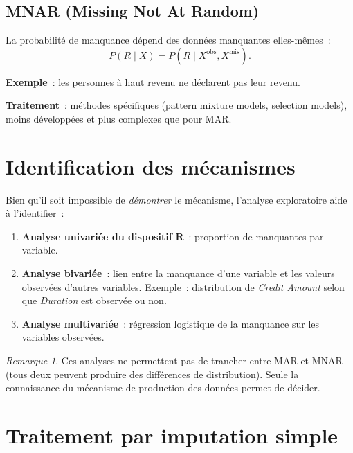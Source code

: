 \documentclass[a4paper,11pt]{article}
\theoremstyle{definition}
\theoremstyle{remark}
\newtheorem*{remark}{Remarque}
\begin{document}
\subsection{MNAR (Missing Not At Random)}

La probabilité de manquance dépend des données manquantes elles-mêmes~:
\[
P(R \mid X) = P(R \mid X^{\text{obs}}, X^{\text{mis}}).
\]

\textbf{Exemple}~: les personnes à haut revenu ne déclarent pas leur
revenu.

\textbf{Traitement}~: méthodes spécifiques (pattern mixture models,
selection models), moins développées et plus complexes que pour MAR.

\section{Identification des mécanismes}

Bien qu'il soit impossible de \emph{démontrer} le mécanisme, l'analyse
exploratoire aide à l'identifier~:

\begin{enumerate}
  \item \textbf{Analyse univariée du dispositif} $\mathbf{R}$~:
    proportion de manquantes par variable.
  \item \textbf{Analyse bivariée}~: lien entre la manquance d'une
    variable et les valeurs observées d'autres variables.
    Exemple~: distribution de \textit{Credit Amount} selon que
    \textit{Duration} est observée ou non.
  \item \textbf{Analyse multivariée}~: régression logistique de la
    manquance sur les variables observées.
\end{enumerate}

\begin{remark}
  Ces analyses ne permettent pas de trancher entre MAR et MNAR (tous
  deux peuvent produire des différences de distribution). Seule la
  connaissance du mécanisme de production des données permet de
  décider.
\end{remark}

\section{Traitement par imputation simple}
\end{document}
